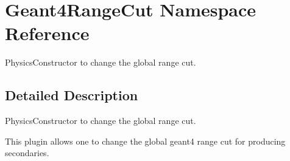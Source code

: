 \hypertarget{namespace_geant4_range_cut}{}\section{Geant4\+Range\+Cut Namespace Reference}
\label{namespace_geant4_range_cut}


Physics\+Constructor to change the global range cut.  




\subsection{Detailed Description}
Physics\+Constructor to change the global range cut. 

This plugin allows one to change the global geant4 range cut for producing secondaries. 